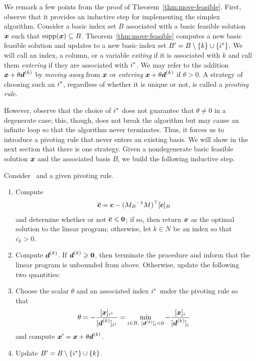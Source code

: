 We remark a few points from the proof of Theorem~\ref{thm:move-feasible}. First, observe that it provides an inductive step for implementing the simplex algorithm. Consider a basic index set $B$ associated with a basic feasible solution ${\boldsymbol x}$ such that $\operatorname{supp}({\boldsymbol x})\subseteq B$. Theorem~\ref{thm:move-feasible} computes a new basic feasible solution and updates to a new basic index set $B' = B \setminus \{k\} \cup \{i^\ast\}$. We will call an index, a column, or a variable {\em exiting} if it is associated with $k$ and call them {\em entering} if they are associated with $i^\ast$. We may refer to the addition ${\boldsymbol x} + \theta {\boldsymbol d}^{(k)}$ by {\em moving away} from ${\boldsymbol x}$ or {\em entering ${\boldsymbol x} + \theta {\boldsymbol d}^{(k)}$} if $\theta > 0$. A strategy of choosing such an $i^\ast$, regardless of whether it is unique or not, is called a {\em pivoting rule}.

However, observe that the choice of $i^\ast$ does not guarantee that $\theta \neq 0$ in a degenerate case; this, though, does not break the algorithm but may cause an infinite loop so that the algorithm never terminates. Thus, it forces us to introduce a pivoting rule that never enters an existing basis. We will show in the next section that there is one strategy. Given a nondegenerate basic feasible solution ${\boldsymbol x}$ and the associated basis $B$, we build the following inductive step. 

\begin{definition}
Consider \LPSA~and a given pivoting rule. 
\begin{enumerate}
\item Compute 
$$ \overline{{\boldsymbol c}} =  {\boldsymbol c} -  ({M_B}^{-1}M)^\top [{\boldsymbol c}]_B $$ and determine whether or not $\overline{{\boldsymbol c}} \leqslant \boldsymbol0$; if so, then return ${\boldsymbol x}$ as the optimal solution to the linear program; otherwise, let $k\in N$ be an index so that $\overline{c_k} > 0$. 
\item Compute ${\boldsymbol d}^{(k)}$. If ${\boldsymbol d}^{(k)} \geqslant \boldsymbol0$, then terminate the procedure and inform that the linear program is unbounded from above. Otherwise, update the following two quantities: 
\item Choose the scalar $\theta$ and an associated index $i^\ast$ under the pivoting rule so that
\[\theta = - \frac{[{\boldsymbol x}]_{i^\ast}}{ [{\boldsymbol d}^{(k)}]_{i^\ast}} =  \min_{i \in B,~ [{\boldsymbol d}^{(k)}]_{i} < 0}  - \frac{[{\boldsymbol x}]_{i}}{ [{\boldsymbol d}^{(k)}]_{i}} \] and compute 
${\boldsymbol x}' = {\boldsymbol x} + \theta {\boldsymbol d}^{(k)}$. 
\item Update $B' = B\setminus\{ i^\ast \}\cup \{k\}$. 
\end{enumerate}
\end{definition}



